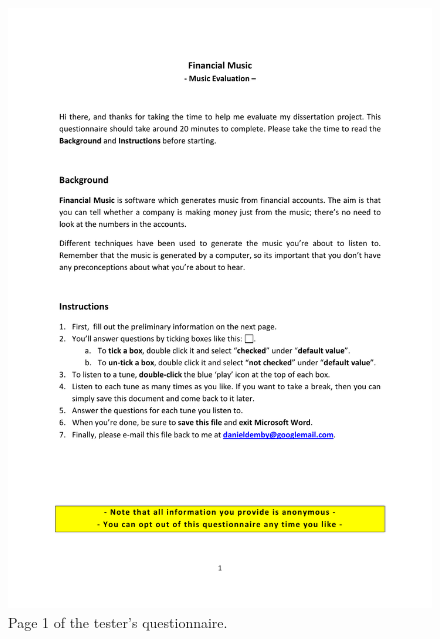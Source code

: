 \begin{figure}[ht]
\centering
\includegraphics[scale=0.6]{qt1}
\caption{Page 1 of the tester's questionnaire.}
\label{fig:qt1}
\end{figure}

